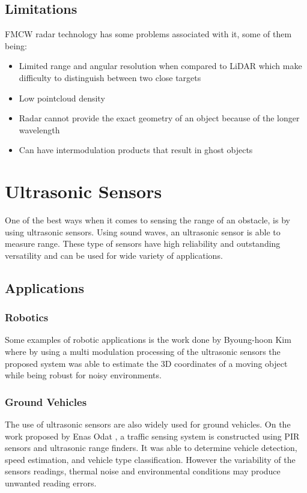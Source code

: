  
\subsection{Limitations}
\ac{FMCW} {radar} technology has some problems associated with it, some of them being:
\begin{itemize}
\item{Limited range and angular resolution when compared to \ac{LiDAR} which make difficulty to distinguish between two close targets}  
\item{Low pointcloud density}  
\item{Radar cannot provide the exact geometry of an object because of the longer wavelength}  
\item{Can have intermodulation products that result in ghost objects} 
\end{itemize}


\section{Ultrasonic Sensors}
One of the best ways when it comes to  sensing the range of an obstacle, is by using ultrasonic sensors. Using sound waves, an ultrasonic sensor is able to measure range. 
These type of sensors have high reliability and outstanding versatility and can be used for wide variety of applications. 

\subsection{Applications}
\subsubsection{Robotics}
Some examples of robotic applications is the work done by Byoung-hoon Kim \cite{kim2006improved} where by using a multi modulation processing of the ultrasonic sensors the proposed system was able to estimate the 3D coordinates of a moving object while being robust for noisy environments.
\subsubsection{Ground Vehicles}
The use of ultrasonic sensors are also widely used for ground vehicles. On the work  proposed by Enas Odat \cite{pir}, a traffic sensing system is constructed using \ac{PIR} sensors and ultrasonic range finders. It was able to determine  vehicle detection, speed estimation, and vehicle type classification. However the variability of the sensors readings, thermal noise and environmental conditions may produce unwanted reading errors.
